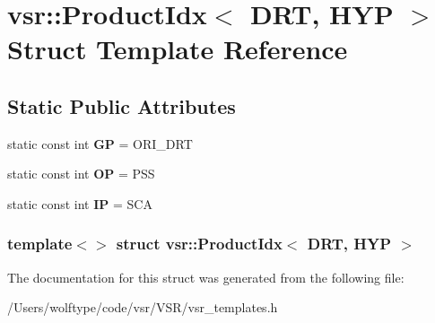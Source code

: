 \hypertarget{structvsr_1_1_product_idx_3_01_d_r_t_00_01_h_y_p_01_4}{\section{vsr\-:\-:Product\-Idx$<$ D\-R\-T, H\-Y\-P $>$ Struct Template Reference}
\label{structvsr_1_1_product_idx_3_01_d_r_t_00_01_h_y_p_01_4}
}
\subsection*{Static Public Attributes}
\begin{DoxyCompactItemize}
\item 
\hypertarget{structvsr_1_1_product_idx_3_01_d_r_t_00_01_h_y_p_01_4_a18d781a2af3ee4496b5efc5e052de830}{static const int {\bfseries G\-P} = O\-R\-I\-\_\-\-D\-R\-T}\label{structvsr_1_1_product_idx_3_01_d_r_t_00_01_h_y_p_01_4_a18d781a2af3ee4496b5efc5e052de830}

\item 
\hypertarget{structvsr_1_1_product_idx_3_01_d_r_t_00_01_h_y_p_01_4_aa9cd8c6ac62b0101ff4600ab76efa0b1}{static const int {\bfseries O\-P} = P\-S\-S}\label{structvsr_1_1_product_idx_3_01_d_r_t_00_01_h_y_p_01_4_aa9cd8c6ac62b0101ff4600ab76efa0b1}

\item 
\hypertarget{structvsr_1_1_product_idx_3_01_d_r_t_00_01_h_y_p_01_4_ad019f1c74b7ffc7047363e33d4603186}{static const int {\bfseries I\-P} = S\-C\-A}\label{structvsr_1_1_product_idx_3_01_d_r_t_00_01_h_y_p_01_4_ad019f1c74b7ffc7047363e33d4603186}

\end{DoxyCompactItemize}
\subsubsection*{template$<$$>$ struct vsr\-::\-Product\-Idx$<$ D\-R\-T, H\-Y\-P $>$}



The documentation for this struct was generated from the following file\-:\begin{DoxyCompactItemize}
\item 
/\-Users/wolftype/code/vsr/\-V\-S\-R/vsr\-\_\-templates.\-h\end{DoxyCompactItemize}
